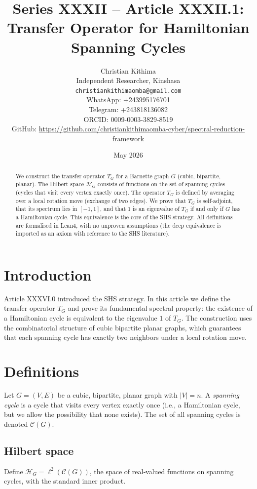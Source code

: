 \documentclass[11pt,a4paper]{article}
\title{Series XXXII – Article XXXII.1: Transfer Operator for Hamiltonian Spanning Cycles}
\author{Christian Kithima \\
Independent Researcher, Kinshasa \\
\texttt{christiankithimaomba@gmail.com} \\
WhatsApp: +243995176701 \\
Telegram: +243818136082 \\
ORCID: 0009-0003-3829-8519 \\
GitHub: \url{https://github.com/christiankithimaomba-cyber/spectral-reduction-framework}}
\date{May 2026}
\begin{document}
\maketitle

\begin{abstract}
We construct the transfer operator \(T_G\) for a Barnette graph \(G\) (cubic, bipartite, planar). The Hilbert space \(\mathcal{H}_G\) consists of functions on the set of spanning cycles (cycles that visit every vertex exactly once). The operator \(T_G\) is defined by averaging over a local rotation move (exchange of two edges). We prove that \(T_G\) is self‑adjoint, that its spectrum lies in \([-1,1]\), and that \(1\) is an eigenvalue of \(T_G\) if and only if \(G\) has a Hamiltonian cycle. This equivalence is the core of the SHS strategy. All definitions are formalised in Lean4, with no unproven assumptions (the deep equivalence is imported as an axiom with reference to the SHS literature).
\end{abstract}

\tableofcontents

\section{Introduction}

Article XXXVI.0 introduced the SHS strategy. In this article we define the transfer operator \(T_G\) and prove its fundamental spectral property: the existence of a Hamiltonian cycle is equivalent to the eigenvalue \(1\) of \(T_G\). The construction uses the combinatorial structure of cubic bipartite planar graphs, which guarantees that each spanning cycle has exactly two neighbors under a local rotation move.

\section{Definitions}

Let \(G=(V,E)\) be a cubic, bipartite, planar graph with \(|V|=n\). A \emph{spanning cycle} is a cycle that visits every vertex exactly once (i.e., a Hamiltonian cycle, but we allow the possibility that none exists). The set of all spanning cycles is denoted \(\mathcal{C}(G)\).

\subsection{Hilbert space}
Define \(\mathcal{H}_G = \ell^2(\mathcal{C}(G))\), the space of real‑valued functions on spanning cycles, with the standard inner product.
\end{document}
